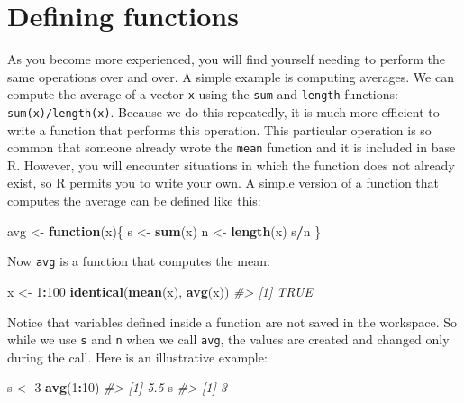 \documentclass[
]{krantz}
\newenvironment{Shaded}{\begin{snugshade}}{\end{snugshade}}
\newcommand{\CommentTok}[1]{\textcolor[rgb]{0.37,0.37,0.37}{\textit{#1}}}
\newcommand{\ControlFlowTok}[1]{\textcolor[rgb]{0.27,0.27,0.27}{\textbf{#1}}}
\newcommand{\DecValTok}[1]{\textcolor[rgb]{0.06,0.06,0.06}{#1}}
\newcommand{\KeywordTok}[1]{\textcolor[rgb]{0.27,0.27,0.27}{\textbf{#1}}}
\newcommand{\NormalTok}[1]{#1}
\newcommand{\OperatorTok}[1]{\textcolor[rgb]{0.43,0.43,0.43}{\textbf{#1}}}
\newcommand{\StringTok}[1]{\textcolor[rgb]{0.5,0.5,0.5}{#1}}
\begin{document}
\hypertarget{defining-functions}{%
\section{Defining functions}\label{defining-functions}}

As you become more experienced, you will find yourself needing to perform the same operations over and over. A simple example is computing averages. We can compute the average of a vector \texttt{x} using the \texttt{sum} and \texttt{length} functions: \texttt{sum(x)/length(x)}. Because we do this repeatedly, it is much more efficient to write a function that performs this operation. This particular operation is so common that someone already wrote the \texttt{mean} function and it is included in base R. However, you will encounter situations in which the function does not already exist, so R permits you to write your own. A simple version of a function that computes the average can be defined like this:

\begin{Shaded}
\begin{Highlighting}[]
\NormalTok{avg <-}\StringTok{ }\ControlFlowTok{function}\NormalTok{(x)\{}
\NormalTok{  s <-}\StringTok{ }\KeywordTok{sum}\NormalTok{(x)}
\NormalTok{  n <-}\StringTok{ }\KeywordTok{length}\NormalTok{(x)}
\NormalTok{  s}\OperatorTok{/}\NormalTok{n}
\NormalTok{\}}
\end{Highlighting}
\end{Shaded}

Now \texttt{avg} is a function that computes the mean:

\begin{Shaded}
\begin{Highlighting}[]
\NormalTok{x <-}\StringTok{ }\DecValTok{1}\OperatorTok{:}\DecValTok{100}
\KeywordTok{identical}\NormalTok{(}\KeywordTok{mean}\NormalTok{(x), }\KeywordTok{avg}\NormalTok{(x))}
\CommentTok{#> [1] TRUE}
\end{Highlighting}
\end{Shaded}

Notice that variables defined inside a function are not saved in the workspace. So while we use \texttt{s} and \texttt{n} when we call \texttt{avg}, the values are created and changed only during the call. Here is an illustrative example:

\begin{Shaded}
\begin{Highlighting}[]
\NormalTok{s <-}\StringTok{ }\DecValTok{3}
\KeywordTok{avg}\NormalTok{(}\DecValTok{1}\OperatorTok{:}\DecValTok{10}\NormalTok{)}
\CommentTok{#> [1] 5.5}
\NormalTok{s}
\CommentTok{#> [1] 3}
\end{Highlighting}
\end{Shaded}
\end{document}
